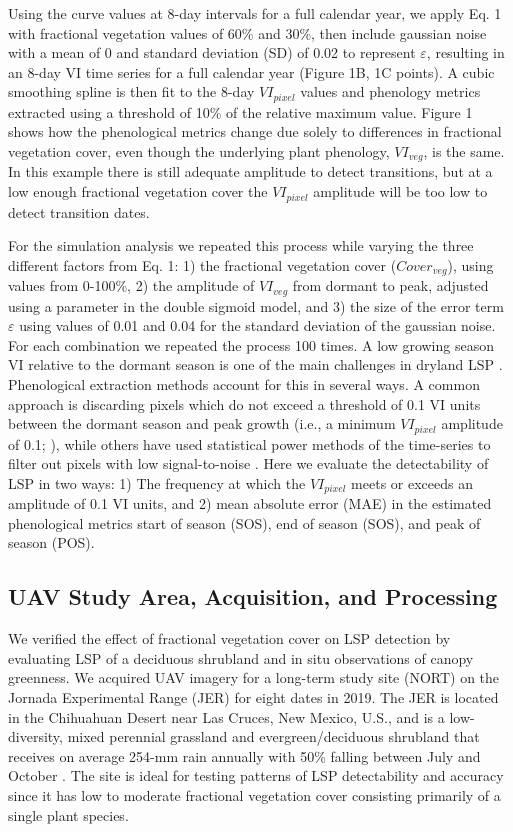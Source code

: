 \documentclass{article}
\begin{document}
Using the curve values at 8-day intervals for a full calendar year, we apply Eq. 1 with fractional vegetation values of 60\% and 30\%, then include gaussian noise with a mean of 0 and standard deviation (SD) of 0.02 to represent $\varepsilon$, resulting in an 8-day VI time series for a full calendar year (Figure 1B, 1C points). A cubic smoothing spline is then fit to the 8-day $VI_{pixel}$ values and phenology metrics extracted using a threshold of 10\% of the relative maximum value. Figure 1 shows how the phenological metrics change due solely to differences in fractional vegetation cover, even though the underlying plant phenology, $VI_{veg}$, is the same. In this example there is still adequate amplitude to detect transitions, but at a low enough fractional vegetation cover the $VI_{pixel}$ amplitude will be too low to detect transition dates.

For the simulation analysis we repeated this process while varying the three different factors from Eq. 1: 1) the fractional vegetation cover ($Cover_{veg}$), using values from 0-100\%, 2) the amplitude of $VI_{veg}$ from dormant to peak, adjusted using a parameter in the double sigmoid model, and 3) the size of the error term $\varepsilon$ using values of 0.01 and 0.04 for the standard deviation of the gaussian noise. For each combination we repeated the process 100 times. A low growing season VI relative to the dormant season is one of the main challenges in dryland LSP \cite{smith2019}. Phenological extraction methods account for this in several ways. A common approach is discarding pixels which do not exceed a threshold of 0.1 VI units between the dormant season and peak growth (i.e., a minimum $VI_{pixel}$ amplitude of 0.1; \cite{white2009, jeong2011, garonna2016, gray2019}), while others have used statistical power methods of the time-series to filter out pixels with low signal-to-noise \cite{dannenberg2017}. Here we evaluate the detectability of LSP in two ways: 1) The frequency at which the $VI_{pixel}$ meets or exceeds an amplitude of 0.1 VI units, and 2) mean absolute error (MAE) in the estimated phenological metrics start of season (SOS), end of season (SOS), and peak of season (POS). 

\subsection{UAV Study Area, Acquisition, and Processing}

We verified the effect of fractional vegetation cover on LSP detection by evaluating LSP of a deciduous shrubland and in situ observations of canopy greenness. We acquired UAV imagery for a long-term study site (NORT) on the Jornada Experimental Range (JER) for eight dates in 2019. The JER is located in the Chihuahuan Desert near Las Cruces, New Mexico, U.S., and is a low-diversity, mixed perennial grassland and evergreen/deciduous shrubland that receives on average 254-mm rain annually with 50\% falling between July and October \cite{browning2015}. The site is ideal for testing patterns of LSP detectability and accuracy since it has low to moderate fractional vegetation cover consisting primarily of a single plant species.
\end{document}
